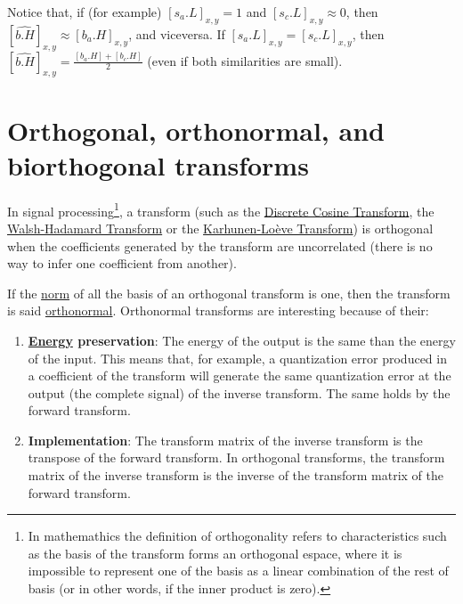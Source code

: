 Notice that, if (for example) $[s_a.L]_{x,y}=1$ and
$[s_c.L]_{x,y}\approx 0$, then
$[\hat{b.H}]_{x,y}\approx [b_a.H]_{x,y}$, and viceversa. If
$[s_a.L]_{x,y}=[s_c.L]_{x,y}$, then
$[\hat{b.H}]_{x,y}=\frac{[b_a.H]+[b_c.H]}{2}$ (even if both similarities are small).




\section{Orthogonal, orthonormal, and biorthogonal transforms}

In signal processing\footnote{In mathemathics the definition of
  orthogonality refers to characteristics such as the basis of the
  transform forms an orthogonal espace, where it is impossible to
  represent one of the basis as a linear combination of the rest of
  basis (or in other words, if the inner product is zero).}, a
transform (such as the
\href{https://en.wikipedia.org/wiki/Discrete_cosine_transform}{Discrete
  Cosine Transform}, the
\href{https://en.wikipedia.org/wiki/Hadamard_transform}{Walsh-Hadamard
  Transform} or the
\href{https://en.wikipedia.org/wiki/Karhunen%E2%80%93Lo%C3%A8ve_theorem}{Karhunen-Loève
  Transform}) is orthogonal when the coefficients generated by the
transform are uncorrelated (there is no way to infer one coefficient
from another).

If the \href{https://en.wikipedia.org/wiki/Norm_(mathematics)}{norm}
of all the basis of an orthogonal transform is one, then the transform
is said
\href{https://en.wikipedia.org/wiki/Orthonormal_basis}{orthonormal}. Orthonormal
transforms are interesting because of their:
\begin{enumerate}
\item
  \textbf{\href{https://en.wikipedia.org/wiki/Energy_(signal_processing)}{Energy}
    preservation}: The energy of the output is the same than the
  energy of the input. This means that, for example, a quantization
  error produced in a coefficient of the transform will generate the
  same quantization error at the output (the complete signal) of the
  inverse transform. The same holds by the forward transform.
\item \textbf{Implementation}: The transform matrix of the
  inverse transform is the transpose of the forward transform. In
  orthogonal transforms, the transform matrix of the inverse transform
  is the inverse of the transform matrix of the forward transform.
\end{enumerate}

